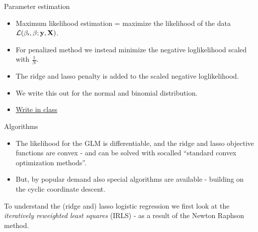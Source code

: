 \documentclass[
  ignorenonframetext,
]{beamer}
\providecommand{\tightlist}{%
  \setlength{\itemsep}{0pt}\setlength{\parskip}{0pt}}
\begin{document}
\begin{frame}

\begin{block}{Parameter estimation}

\begin{itemize}
\item
  Maximum likelihood estimation = maximize the likelihood of the data
  \(\cal L(\beta_0,\beta; {\bf y}, {\bf X})\).
\item
  For penalized method we instead minimize the negative loglikelihood
  scaled with \(\frac{1}{N}\).
\item
  The ridge and lasso penalty is added to the scaled negative
  loglikelihood.
\item
  We write this out for the normal and binomial distribution.
\item
  \href{classnotelink}{Write in class}
\end{itemize}

\end{block}

\end{frame}

\begin{frame}

\end{frame}

\begin{frame}

\begin{block}{Algorithms}

\begin{itemize}
\tightlist
\item
  The likelihood for the GLM is differentiable, and the ridge and lasso
  objective functions are convex - and can be solved with socalled
  ``standard convex optimization methods''.
\item
  But, by popular demand also special algorithms are available -
  building on the cyclic coordinate descent.
\end{itemize}

To understand the (ridge and) lasso logistic regression we first look at
the \emph{iteratively reweighted least squares} (IRLS) - as a result of
the Newton Raphson method.

\end{block}

\end{frame}

\begin{frame}

\end{frame}
\end{document}
